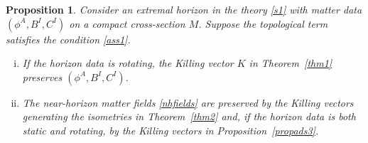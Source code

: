 \documentclass[11pt, reqno]{amsart}
\theoremstyle{plain}
\newtheorem{prop}[theorem]{Proposition}
\theoremstyle{definition}
\numberwithin{equation}{section}
\begin{document}
\begin{prop} \label{propm1}
    Consider an extremal horizon in the theory \eqref{s1} with matter data $(\phi^A,B^I,C^I)$ on a compact cross-section $M$. Suppose the topological term satisfies the condition \eqref{ass1}. 
    \begin{enumerate}[(i)]
        \item If the horizon data is rotating, the Killing vector $K$ in Theorem~\ref{thm1} preserves $(\phi^A,B^I,C^I)$. \vspace{.1cm}
        \item The near-horizon matter fields \eqref{nhfields} are preserved by the Killing vectors generating the isometries in Theorem~\ref{thm2} and, if the horizon data is both static and rotating, by the Killing vectors in Proposition~\ref{propads3}.
    \end{enumerate}
\end{prop}
\end{document}
